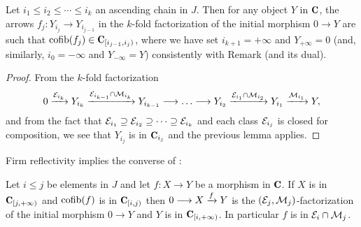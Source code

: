 \begin{corollary} \label{cor:perPostnikov}
Let $i_1\leq i_2\leq\cdots\leq i_k$ an ascending chain in $J$. Then for any object $Y$ in $\C$, the arrows $f_j\colon Y_{i_j}\to Y_{i_{j-1}}$ in the $k$-fold factorization of the initial morphism $0\to Y$ are such that $\cofib(f_j)\in \C_{[i_{j-1},i_j)}$, where we have set $i_{k+1}=+\infty$ and $Y_{+\infty}=0$ (and, similarly, $i_{0}=-\infty$ and $Y_{-\infty}=Y$) consistently with Remark  (and its dual).
\end{corollary}
\begin{proof}
From the $k$-fold factorization
\[
0 \xto{\E_{i_k}} Y_{i_k} \xto{\E_{i_{k-1}}\cap \M_{i_k}} Y_{i_{k-1}}\to\dots\to Y_{i_{2}} \xto{\E_{i_{1}}\cap \M_{i_{2}}} Y_{i_1} \xto{\M_{i_{1}}} Y,
\]
and from the fact that $\mathcal{E}_{i_1}\supseteq \mathcal{E}_{i_2} \supseteq\dots\supseteq \mathcal{E}_{i_k}$ and each class $\mathcal{E}_{i_j}$ is closed for composition, we see that $Y_{i_j}$ is in $\C_{i_{j}}$ and the previous lemma applies.
\end{proof}
Firm reflectivity implies the converse of :
\begin{lemma}\label{lemma.vice.versa}
Let $i\leq j$ be elements in $J$ and let $f\colon X\to Y$ be a morphism in $\C$. If $X$ is in $\C_{[j,+\infty)}$ and $\operatorname{cofib}(f)$ is in $\C_{[i,j)}$ then $0\longrightarrow X\xrightarrow{f}Y$ is the $(\mathcal{E}_j,\mathcal{M}_j)$-factorization of the initial morphism $0\to Y$ and $Y$ is in $\C_{[i,+\infty)}$. In particular $f$ is in $\mathcal{E}_i\cap \mathcal{M}_j$. \end{lemma}
